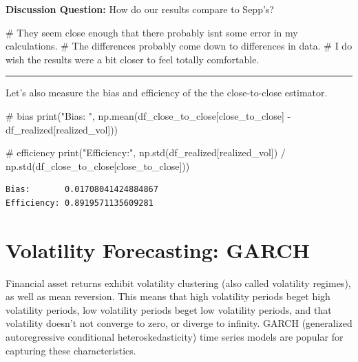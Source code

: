 \documentclass[
  letterpaper,
  DIV=11,
  numbers=noendperiod]{scrreprt}
\newenvironment{Shaded}{\begin{snugshade}}{\end{snugshade}}
\newcommand{\BuiltInTok}[1]{\textcolor[rgb]{0.00,0.23,0.31}{#1}}
\newcommand{\CommentTok}[1]{\textcolor[rgb]{0.37,0.37,0.37}{#1}}
\newcommand{\NormalTok}[1]{\textcolor[rgb]{0.00,0.23,0.31}{#1}}
\newcommand{\OperatorTok}[1]{\textcolor[rgb]{0.37,0.37,0.37}{#1}}
\newcommand{\StringTok}[1]{\textcolor[rgb]{0.13,0.47,0.30}{#1}}
\begin{document}
\textbf{Discussion Question:} How do our results compare to Sepp's?

\begin{Shaded}
\begin{Highlighting}[]
\CommentTok{\# They seem close enough that there probably isn\textquotesingle{}t some error in my calculations.}
\CommentTok{\# The differences probably come down to differences in data.}
\CommentTok{\# I do wish the results were a bit closer to feel totally comfortable.}
\end{Highlighting}
\end{Shaded}

\begin{center}\rule{0.5\linewidth}{0.5pt}\end{center}

Let's also measure the bias and efficiency of the the close-to-close
estimator.

\begin{Shaded}
\begin{Highlighting}[]
\CommentTok{\# bias}
\BuiltInTok{print}\NormalTok{(}\StringTok{"Bias:      "}\NormalTok{, np.mean(df\_close\_to\_close[}\StringTok{\textquotesingle{}close\_to\_close\textquotesingle{}}\NormalTok{] }\OperatorTok{{-}}\NormalTok{ df\_realized[}\StringTok{\textquotesingle{}realized\_vol\textquotesingle{}}\NormalTok{]))}

\CommentTok{\# efficiency}
\BuiltInTok{print}\NormalTok{(}\StringTok{"Efficiency:"}\NormalTok{, np.std(df\_realized[}\StringTok{\textquotesingle{}realized\_vol\textquotesingle{}}\NormalTok{]) }\OperatorTok{/}\NormalTok{ np.std(df\_close\_to\_close[}\StringTok{\textquotesingle{}close\_to\_close\textquotesingle{}}\NormalTok{]))}
\end{Highlighting}
\end{Shaded}

\begin{verbatim}
Bias:       0.01708041424884867
Efficiency: 0.8919571135609281
\end{verbatim}

\hypertarget{volatility-forecasting-garch}{%
\chapter{Volatility Forecasting:
GARCH}\label{volatility-forecasting-garch}}

Financial asset returns exhibit volatility clustering (also called
volatility regimes), as well as mean reversion. This means that high
volatility periods beget high volatility periods, low volatility periods
beget low volatility periods, and that volatility doesn't not converge
to zero, or diverge to infinity. GARCH (generalized autoregressive
conditional heteroskedasticity) time series models are popular for
capturing these characteristics.
\end{document}
